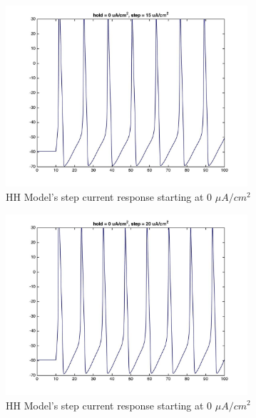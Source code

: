 \documentclass{beamer}
\begin{document}
\begin{frame}
  \begin{figure}
    \centering
    \includegraphics[width = 0.8\textwidth]{./images/current_0_15.jpg}
    \caption{HH Model's step current response starting at 0 $\mu A/cm^2$}
  \end{figure}
\end{frame}


\begin{frame}
  \begin{figure}
    \centering
    \includegraphics[width = 0.8\textwidth]{./images/current_0_20.jpg}
    \caption{HH Model's step current response starting at 0 $\mu A/cm^2$}
  \end{figure}
\end{frame}
\end{document}

